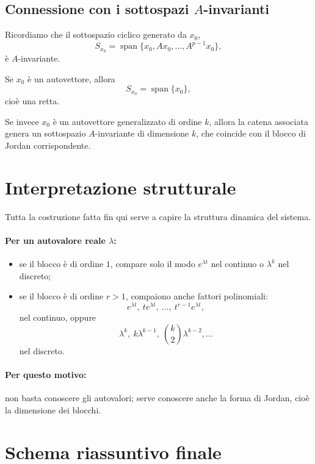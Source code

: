 \subsection{Connessione con i sottospazi \texorpdfstring{$A$}{A}-invarianti}

Ricordiamo che il sottospazio ciclico generato da $x_0$,
\[
S_{x_0}=\operatorname{span}\{x_0,Ax_0,\dots,A^{p-1}x_0\},
\]
è $A$-invariante.

Se $x_0$ è un autovettore, allora
\[
S_{x_0}=\operatorname{span}\{x_0\},
\]
cioè una retta.

Se invece $x_0$ è un autovettore generalizzato di ordine $k$, allora la catena associata genera un sottospazio $A$-invariante di dimensione $k$, che coincide con il blocco di Jordan corrispondente.

\section{Interpretazione strutturale}

Tutta la costruzione fatta fin qui serve a capire la struttura dinamica del sistema.

\paragraph{Per un autovalore reale $\lambda$:}
\begin{itemize}
    \item se il blocco è di ordine $1$, compare solo il modo $e^{\lambda t}$ nel continuo o $\lambda^k$ nel discreto;
    \item se il blocco è di ordine $r>1$, compaiono anche fattori polinomiali:
    \[
    e^{\lambda t},\ te^{\lambda t},\ \dots,\ t^{r-1}e^{\lambda t},
    \]
    nel continuo, oppure
    \[
    \lambda^k,\ k\lambda^{k-1},\ \binom{k}{2}\lambda^{k-2},\dots
    \]
    nel discreto.
\end{itemize}

\paragraph{Per questo motivo:}
non basta conoscere gli autovalori; serve conoscere anche la forma di Jordan, cioè la dimensione dei blocchi.

\section{Schema riassuntivo finale}


